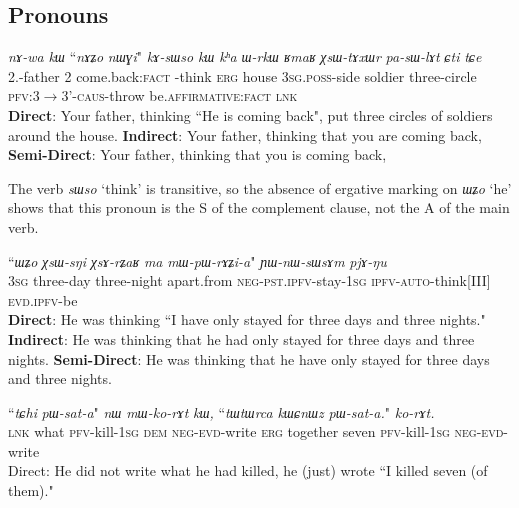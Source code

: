 \documentclass[11pt]{article}
\newcommand{\ipa}[1]{{\textit{\phon #1}}} %
\begin{document}
 
 \subsection{Pronouns}

   \begin{exe}
\ex \label{ex:nWGi.kAsWso}
\gll 
\ipa{nɤ-wa}  	\ipa{kɯ}  	{``\ipa{nɤʑo}} 	\ipa{nɯɣi}"  	\ipa{kɤ-sɯso}  	\ipa{kɯ}  	\ipa{kʰa}  	\ipa{ɯ-rkɯ}  	\ipa{ʁmaʁ}  	\ipa{χsɯ-tɤxɯr}  	\ipa{pa-sɯ-lɤt}  	\ipa{ɕti}  	\ipa{tɕe}  \\
{2\sg.\poss-father} {\erg} {2\sg} {come.back:\textsc{fact}}  \infin-think \textsc{erg} house \textsc{3sg.poss}-side soldier three-circle \textsc{pfv:3$\rightarrow$3'-caus}-throw be.\textsc{affirmative}:\textsc{fact} \textsc{lnk}\\
\glt \textbf{Direct}: Your father, thinking ``{He} {is coming back}",   put three circles of soldiers around the house. 
\glt  \textbf{Indirect}: Your father, thinking that {you} are coming back,
\glt  \textbf{Semi-Direct}: Your father, thinking that {you} {is coming back}, 
\end{exe}
   
The verb \ipa{sɯso} `think' is transitive, so the absence of ergative marking on \ipa{ɯʑo} `he' shows that this pronoun is the S of the complement clause, not the A of the main verb.
      
\begin{exe}
\ex
\gll  ``{\ipa{ɯʑo}}  	\ipa{χsɯ-sŋi}  	\ipa{χsɤ-rʑaʁ}  	\ipa{ma}  	{\ipa{mɯ-pɯ-rɤʑi-a}}"  	\ipa{ɲɯ-nɯ-sɯsɤm}  	\ipa{pjɤ-ŋu}  \\
{\textsc{3sg}} three-day  three-night apart.from {\textsc{neg-pst.ipfv}-stay-\textsc{1sg}} \textsc{ipfv-auto}-think[III] \textsc{evd.ipfv}-be \\
\glt    \textbf{Direct}: He was thinking ``{I} {have} only {stayed} for three days and three nights."
\glt    \textbf{Indirect}: He was thinking that {he} had only stayed for three days and three nights.
\glt  \textbf{Semi-Direct}: He was thinking that {he} {have} only {stayed} for three days and three nights. 
\end{exe}
  
 
 
  
\begin{exe}
\ex
\gll \ipa{tɕe}  	``{\ipa{tɕhi}}  	{\ipa{pɯ-sat-a}}"  	\ipa{nɯ}  	\ipa{mɯ-ko-rɤt}  	\ipa{kɯ,}  	``\ipa{tɯtɯrca}  	\ipa{kɯɕnɯz}  	\ipa{pɯ-sat-a.}"  	\ipa{ko-rɤt.}  \\
\textsc{lnk} {what} {\textsc{pfv}-kill-\textsc{1sg}}  \textsc{dem} \textsc{neg-evd}-write \textsc{erg} together seven \textsc{pfv}-kill-\textsc{1sg} \textsc{neg-evd}-write \\
\glt Direct: He did not write {what} he had killed,  he (just) wrote ``I killed seven (of them)."
 \end{exe}
 
\end{document}
